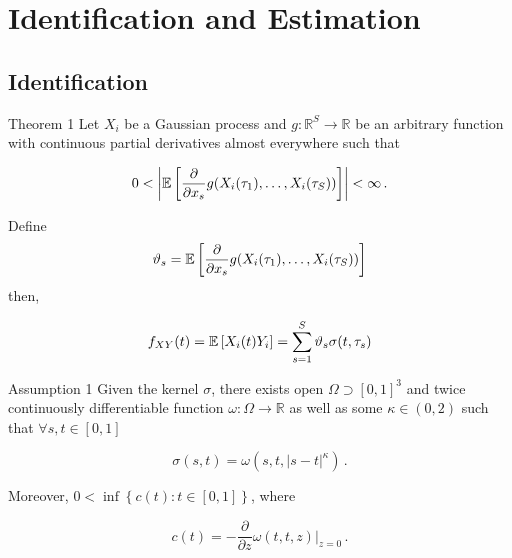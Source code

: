 \section{Identification and Estimation}


\subsection{Identification}

\begin{frame}{Theorem 1}
\vspace{-0.5cm}
Let $X_i$ be a Gaussian process and $g : \mathbb{R}^S \to \mathbb{R}$ be an arbitrary
function with continuous partial derivatives almost everywhere such that 

$$
0 < \left| \mathbb{E}\left[\frac{\partial}{\partial x_s} g(X_i(\tau_1), \dots,
X_i(\tau_S))\right] \right| < \infty \,.
$$

Define
$$
\vartheta_s = \mathbb{E}\left[\frac{\partial}{\partial x_s} g(X_i(\tau_1), \dots,
X_i(\tau_S))\right]
$$
then,

$$
f_{XY}(t) = \mathbb{E}\left[X_i(t) Y_i\right] = \sum_{s=1}^S \vartheta_s \sigma(t, \tau_s)
$$
\end{frame}


\begin{frame}{Assumption 1}
    Given the kernel $\sigma$, there exists open $\Omega \supset [0, 1]^3$ and twice
    continuously differentiable function $\omega : \Omega \to \mathbb{R}$ as well as
    some $\kappa \in (0, 2)$ such that $\forall s, t \in [0, 1]$

    $$\sigma(s, t) = \omega(s, t, |s-t|^{\kappa}) \,.$$

    Moreover, $0 < \inf \left\{ c(t) : t \in [0, 1] \right\}$, where

    $$c(t) = -\frac{\partial}{\partial z} \omega(t, t, z)|_{z = 0} \,.$$
\end{frame}


